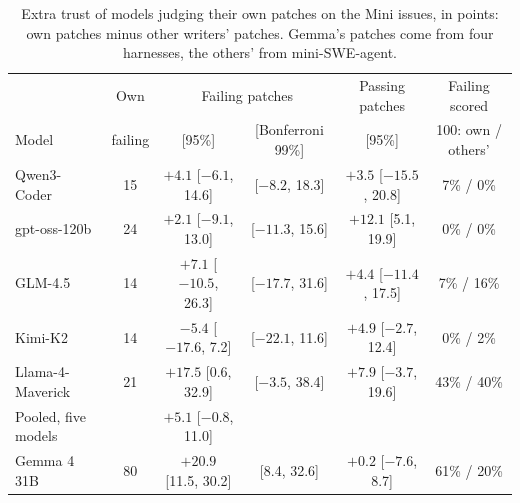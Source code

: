 \documentclass[10pt,letterpaper]{article}
\begin{document}
\begin{table}[H]
\centering
\small
\caption{Extra trust of models judging their own patches on the Mini issues, in points: own patches minus other
writers' patches. Gemma's patches come from four harnesses, the others' from mini-SWE-agent.}
\label{tab:fivelen}
\setlength{\tabcolsep}{3pt}
\begin{tabular}{@{}lccccc@{}}
\toprule
 & Own & \multicolumn{2}{c}{Failing patches} & Passing patches & Failing scored \\
Model & failing & [95\%] & [Bonferroni 99\%] & [95\%] & 100: own / others' \\
\midrule
Qwen3-Coder & 15 & $+4.1$ [$-6.1$, 14.6] & [$-8.2$, 18.3] & $+3.5$ [$-15.5$, 20.8] & 7\% / 0\% \\
gpt-oss-120b & 24 & $+2.1$ [$-9.1$, 13.0] & [$-11.3$, 15.6] & $+12.1$ [5.1, 19.9] & 0\% / 0\% \\
GLM-4.5 & 14 & $+7.1$ [$-10.5$, 26.3] & [$-17.7$, 31.6] & $+4.4$ [$-11.4$, 17.5] & 7\% / 16\% \\
Kimi-K2 & 14 & $-5.4$ [$-17.6$, 7.2] & [$-22.1$, 11.6] & $+4.9$ [$-2.7$, 12.4] & 0\% / 2\% \\
Llama-4-Maverick & 21 & $+17.5$ [0.6, 32.9] & [$-3.5$, 38.4] & $+7.9$ [$-3.7$, 19.6] & 43\% / 40\% \\
\midrule
Pooled, five models & & $+5.1$ [$-0.8$, 11.0] & & & \\
Gemma 4 31B & 80 & $+20.9$ [11.5, 30.2] & [8.4, 32.6] & $+0.2$ [$-7.6$, 8.7] & 61\% / 20\% \\
\bottomrule
\end{tabular}
\end{table}
\end{document}
